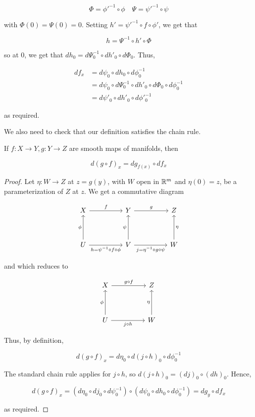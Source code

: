 \[\Phi = \phi'^{-1} \circ \phi \quad \Psi = \psi'^{-1} \circ \psi\]

with $\Phi(0) = \Psi(0) = 0$. Setting $h' = \psi'^{-1} \circ f \circ \phi'$, we get that 

\[ h = \Psi^{-1} \circ h' \circ \Phi \]

so at 0, we get that $dh_0 = d\Psi^{-1}_0 \circ dh'_0 \circ d\Phi_0$. Thus, 

\begin{align*}
    df_x & = d\psi_0 \circ dh_0 \circ d\phi_0^{-1} \\
         & = d\psi_0 \circ d\Psi^{-1}_0 \circ dh'_0 \circ d\Phi_0 \circ d\phi_0^{-1}\\
         & = d\psi'_0 \circ dh'_0 \circ d\phi'^{-1}_0
\end{align*}

as required. 

We also need to check that our definition satisfies the chain rule. 

\begin{theorem}
    If $f: X \to Y, g: Y \to Z$ are smooth maps of manifolds, then 

    \[d(g\circ f)_x = dg_{f(x)} \circ df_x\]
\end{theorem}

\begin{proof}
    Let $\eta: W \to Z$ at $z = g(y)$, with $W$ open in $\mathbb{R}^m$ and $\eta(0) = z$, be a parameterization of $Z$ at $z$. We get a commutative diagram 

    \[\begin{tikzcd}
        X && Y && Z \\
        \\
        U && V && W
        \arrow["f", from=1-1, to=1-3]
        \arrow["g", from=1-3, to=1-5]
        \arrow["\phi", from=3-1, to=1-1]
        \arrow["{h = \psi^{-1} \circ f \circ \phi}"', from=3-1, to=3-3]
        \arrow["\psi", from=3-3, to=1-3]
        \arrow["{j = \eta^{-1} \circ g \circ \psi}"', from=3-3, to=3-5]
        \arrow["\eta"', from=3-5, to=1-5]
    \end{tikzcd}\]

    and which reduces to 

    \[\begin{tikzcd}
        X && Z \\
        \\
        U && W
        \arrow["{g \circ f}", from=1-1, to=1-3]
        \arrow["\phi", from=3-1, to=1-1]
        \arrow["{j \circ h}"', from=3-1, to=3-3]
        \arrow["\eta", from=3-3, to=1-3]
    \end{tikzcd}\]

    Thus, by definition,

    \[d(g \circ f)_x = d\eta_0 \circ d(j \circ h)_0 \circ d\phi_0^{-1}\]

    The standard chain rule applies for $j \circ h$, so $d(j \circ h)_0 = (dj)_0 \circ (dh)_0$. Hence,

    \[d(g \circ f)_x = (d\eta_0 \circ dj_0 \circ d\psi^{-1}_0) \circ (d\psi_0 \circ dh_0 \circ d\phi_0^{-1}) = dg_y \circ df_x\]

    as required. 
\end{proof}

